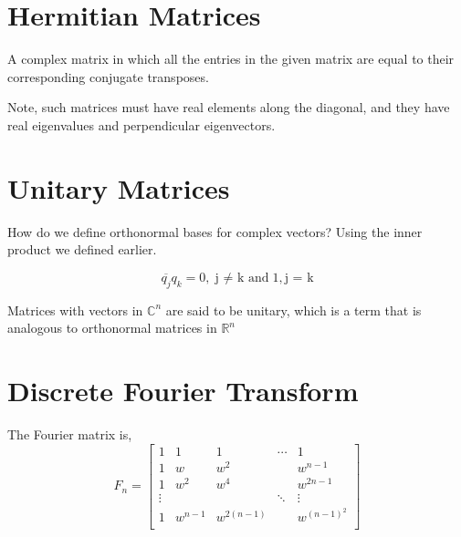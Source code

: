 \documentclass[twoside]{report}
\begin{document}
\section{Hermitian Matrices}
\begin{definition}
	A complex matrix in which all the entries in the given matrix are equal to their corresponding conjugate transposes.
\end{definition}

Note, such matrices must have real elements along the diagonal, and they have real eigenvalues and perpendicular eigenvectors.

\section{Unitary Matrices}
How do we define orthonormal bases for complex vectors? Using the inner product we defined earlier.

\[
	\overline{q_j}q_k = 0, \text{j $\neq$ k and} 1, \text{j = k} 
\]

Matrices with vectors in $\mathbb{C}^n$ are said to be unitary, which is a term that is analogous to orthonormal matrices in $\mathbb{R}^n$

\section{Discrete Fourier Transform}
 

The Fourier matrix is,
\[
	F_n = \begin{bmatrix}
		1 & 1 & 1 & \cdots & 1 \\
		1 & w & w^2 & & w^{n-1} \\
		1 & w^2 & w^4 & & w^{2{n-1}} \\
		\vdots & & & \ddots & \vdots \\
		1 & w^{n-1}& w^{2(n-1)} & & w^{(n-1)^2} \\
	\end{bmatrix}
\]
\end{document}
